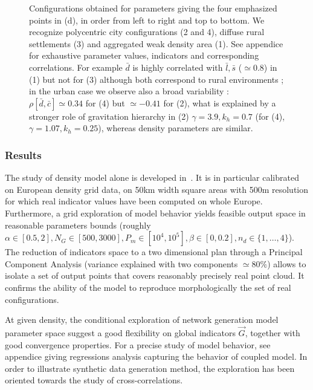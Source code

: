 \begin{figure}
\caption[Examples of generated coupled configurations]{Configurations obtained for parameters giving the four emphasized points in (d), in order from left to right and top to bottom. We recognize polycentric city configurations (2 and 4), diffuse rural settlements (3) and aggregated weak density area (1). See appendice for exhaustive parameter values, indicators and corresponding correlations. For example $\bar{d}$ is highly correlated with $\bar{l},\bar{s}$ ($\simeq$0.8) in (1) but not for (3) although both correspond to rural environments ; in the urban case we observe also a broad variability : $\rho[\bar{d},\bar{c}]\simeq 0.34$ for (4) but $\simeq-0.41$ for (2), what is explained by a stronger role of gravitation hierarchy in (2) $\gamma=3.9,k_h=0.7$ (for (4), $\gamma=1.07,k_h=0.25$), whereas density parameters are similar.}
\end{figure}





\subsubsection{Results}

The study of density model alone is developed in~\cite{raimbault2016calibration}. It is in particular calibrated on European density grid data, on 50km width square areas with 500m resolution for which real indicator values have been computed on whole Europe. Furthermore, a grid exploration of model behavior yields feasible output space in reasonable parameters bounds (roughly $\alpha \in [0.5,2],N_G\in [500,3000], P_m \in [10^4,10^5],\beta\in [0,0.2], n_d \in \{ 1, \ldots , 4\}$). The reduction of indicators space to a two dimensional plan through a Principal Component Analysis (variance explained with two components $\simeq 80\%$) allows to isolate a set of output points that covers reasonably precisely real point cloud. It confirms the ability of the model to reproduce morphologically the set of real configurations.




At given density, the conditional exploration of network generation model parameter space suggest a good flexibility on global indicators $\vec{G}$, together with good convergence properties. For a precise study of model behavior, see appendice giving regressions analysis capturing the behavior of coupled model. In order to illustrate synthetic data generation method, the exploration has been oriented towards the study of cross-correlations.



